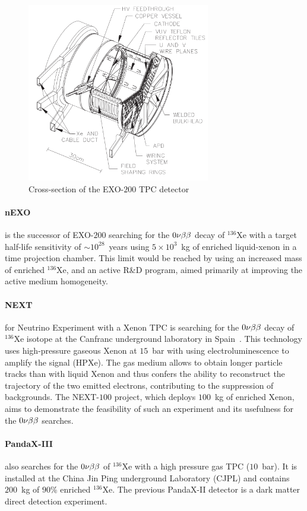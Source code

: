 \begin{figure}
  \centering
  \includegraphics[width=8cm]{neutrinophysics/fig_neutrinophysics/EXO-200.png}
  \caption{Cross-section of the EXO-$200$ TPC detector
    \label{fig:EXO-200}}
\end{figure}

\paragraph{nEXO} is the successor of EXO-$200$ searching for the $0\nu\beta\beta$ decay of $^{136}$Xe with a target half-life sensitivity of $\sim 10^{28}$~years using $5\times 10^3$~kg of enriched liquid-xenon in a time projection chamber.
This limit would be reached by using an increased mass of enriched $^{136}$Xe, and an active R\&D program, aimed primarily at improving the active medium homogeneity.

\paragraph{NEXT} for Neutrino Experiment with a Xenon TPC is searching for the $0\nu\beta\beta$ decay of $^{136}$Xe isotope at the Canfranc underground laboratory in Spain~\cite{art:NEXT_2016}.
This technology uses high-pressure gaseous Xenon at $15$~bar with using electroluminescence to amplify the signal (HPXe).
The gas medium allows to obtain longer particle tracks than with liquid Xenon and thus confers the ability to reconstruct the trajectory of the two emitted electrons, contributing to the suppression of backgrounds.
The NEXT-$100$ project, which deploys $100$~kg of enriched Xenon, aims to demonstrate the feasibility of such an experiment and its usefulness for the $0\nu\beta\beta$ searches.


\paragraph{PandaX-III} also searches for the $0\nu\beta\beta$ of $^{136}$Xe with a high pressure gas TPC ($10$~bar).
It is installed at the China Jin Ping underground Laboratory (CJPL) and contains $200$~kg of $90$\% enriched $^{136}$Xe.
The previous PandaX-II detector is a dark matter direct detection experiment.

